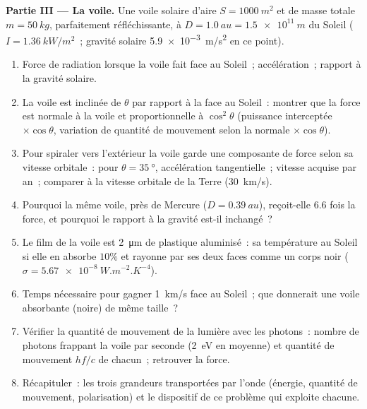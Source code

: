 \begin{problem}
\medskip
\noindent\textbf{Partie III --- La voile.}
Une voile solaire d'aire $S = \qty{1000}{m^2}$ et de masse totale $m = \qty{50}{kg}$,
parfaitement réfléchissante, à $D = \qty{1.0}{au} = \qty{1.5e11}{m}$ du Soleil
($I = \qty{1.36}{kW/m^2}$~; gravité solaire \qty{5.9e-3}{m/s^2} en ce point).
\begin{enumerate}[resume]
  \item Force de radiation lorsque la voile fait face au Soleil~; accélération~;
        rapport à la gravité solaire.
  \item La voile est inclinée de $\theta$ par rapport à la face au Soleil~: montrer que la
        force est normale à la voile et proportionnelle à $\cos^2\theta$
        (puissance interceptée $\times\cos\theta$, variation de quantité de mouvement selon la
        normale $\times\cos\theta$).
  \item Pour spiraler vers l'extérieur la voile garde une composante de force selon sa
        vitesse orbitale~: pour $\theta = \qty{35}{\degree}$, accélération
        tangentielle~; vitesse acquise par an~; comparer à la vitesse orbitale de
        la Terre (\qty{30}{km/s}).
  \item Pourquoi la même voile, près de Mercure ($D = \qty{0.39}{au}$), reçoit-elle
        $6.6$ fois la force, et pourquoi le rapport à la gravité
        est-il inchangé~?
  \item Le film de la voile est \qty{2}{\micro m} de plastique aluminisé~: sa
        température au Soleil si elle en absorbe $10\%$ et rayonne par
        ses deux faces comme un corps noir ($\sigma = \qty{5.67e-8}{W.m^{-2}.K^{-4}}$).
  \item Temps nécessaire pour gagner \qty{1}{km/s} face au Soleil~; que donnerait une
        voile absorbante (noire) de même taille~?
  \item Vérifier la quantité de mouvement de la lumière avec les photons~: nombre de photons
        frappant la voile par seconde (\qty{2}{eV} en moyenne) et
        quantité de mouvement $hf/c$ de chacun~; retrouver la force.
  \item Récapituler~: les trois grandeurs transportées par l'onde (énergie,
        quantité de mouvement, polarisation) et le dispositif de ce problème qui
        exploite chacune.
\end{enumerate}
\end{problem}
